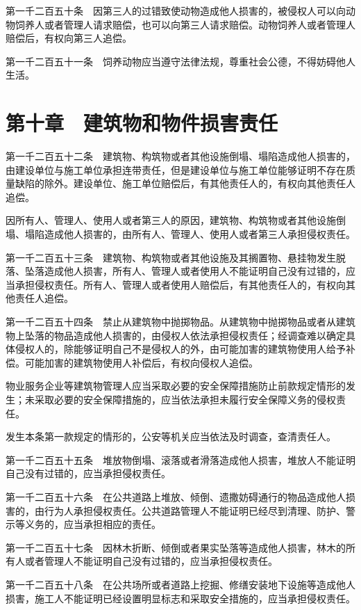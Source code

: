 \documentclass[UTF8,12pt,a4paper]{ctexbook}
\begin{document}
第一千二百五十条　因第三人的过错致使动物造成他人损害的，被侵权人可以向动物饲养人或者管理人请求赔偿，也可以向第三人请求赔偿。动物饲养人或者管理人赔偿后，有权向第三人追偿。

第一千二百五十一条　饲养动物应当遵守法律法规，尊重社会公德，不得妨碍他人生活。

\section*{第十章　建筑物和物件损害责任}

第一千二百五十二条　建筑物、构筑物或者其他设施倒塌、塌陷造成他人损害的，由建设单位与施工单位承担连带责任，但是建设单位与施工单位能够证明不存在质量缺陷的除外。建设单位、施工单位赔偿后，有其他责任人的，有权向其他责任人追偿。

因所有人、管理人、使用人或者第三人的原因，建筑物、构筑物或者其他设施倒塌、塌陷造成他人损害的，由所有人、管理人、使用人或者第三人承担侵权责任。

第一千二百五十三条　建筑物、构筑物或者其他设施及其搁置物、悬挂物发生脱落、坠落造成他人损害，所有人、管理人或者使用人不能证明自己没有过错的，应当承担侵权责任。所有人、管理人或者使用人赔偿后，有其他责任人的，有权向其他责任人追偿。

第一千二百五十四条　禁止从建筑物中抛掷物品。从建筑物中抛掷物品或者从建筑物上坠落的物品造成他人损害的，由侵权人依法承担侵权责任；经调查难以确定具体侵权人的，除能够证明自己不是侵权人的外，由可能加害的建筑物使用人给予补偿。可能加害的建筑物使用人补偿后，有权向侵权人追偿。

物业服务企业等建筑物管理人应当采取必要的安全保障措施防止前款规定情形的发生；未采取必要的安全保障措施的，应当依法承担未履行安全保障义务的侵权责任。

发生本条第一款规定的情形的，公安等机关应当依法及时调查，查清责任人。

第一千二百五十五条　堆放物倒塌、滚落或者滑落造成他人损害，堆放人不能证明自己没有过错的，应当承担侵权责任。

第一千二百五十六条　在公共道路上堆放、倾倒、遗撒妨碍通行的物品造成他人损害的，由行为人承担侵权责任。公共道路管理人不能证明已经尽到清理、防护、警示等义务的，应当承担相应的责任。

第一千二百五十七条　因林木折断、倾倒或者果实坠落等造成他人损害，林木的所有人或者管理人不能证明自己没有过错的，应当承担侵权责任。

第一千二百五十八条　在公共场所或者道路上挖掘、修缮安装地下设施等造成他人损害，施工人不能证明已经设置明显标志和采取安全措施的，应当承担侵权责任。
\end{document}
